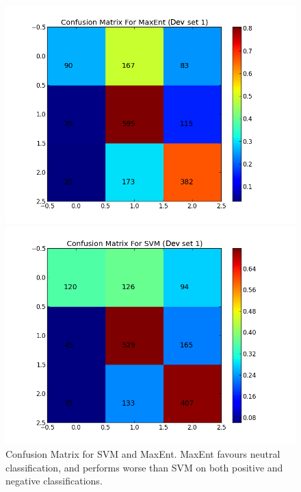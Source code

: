 \begin{figure}[t!]
	\centering
	\begin{minipage}{.45\linewidth}
		\includegraphics[width=\linewidth]{../img/plots/analysis/maxent_confusion_matrix_best.png}
	\end{minipage}
	\hspace{0.05\linewidth}
	\begin{minipage}{.45\linewidth}
		\includegraphics[width=\linewidth]{../img/plots/analysis/svm_confusion_matrix_best.png}
	\end{minipage}
	\caption[Confusion Matrix for SVM and MaxEnt]{Confusion Matrix for SVM and MaxEnt. MaxEnt favours neutral classification, and performs worse than SVM on both positive and negative classifications.}
	\label{fig:best_result_confusion}
\end{figure}

